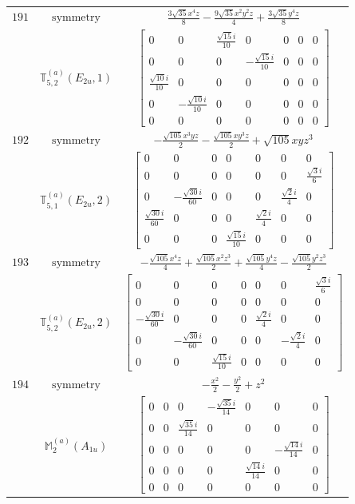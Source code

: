 \documentclass[fleqn,8pt,landscape]{jsarticle}
\begin{document}
\begin{longtable}{ccc}
$ 191 $ & $ \text{symmetry} $ & $ \frac{3 \sqrt{35} x^{4} z}{8} - \frac{9 \sqrt{35} x^{2} y^{2} z}{4} + \frac{3 \sqrt{35} y^{4} z}{8} $ \\
$  $ & $ \mathbb{T}_{5,2}^{(a)}(E_{2u},1) $ & $ \begin{bmatrix} 0 & 0 & \frac{\sqrt{15} i}{10} & 0 & 0 & 0 & 0 \\ 0 & 0 & 0 & - \frac{\sqrt{15} i}{10} & 0 & 0 & 0 \\ \frac{\sqrt{10} i}{10} & 0 & 0 & 0 & 0 & 0 & 0 \\ 0 & - \frac{\sqrt{10} i}{10} & 0 & 0 & 0 & 0 & 0 \\ 0 & 0 & 0 & 0 & 0 & 0 & 0 \end{bmatrix} $ \\ \hline
$ 192 $ & $ \text{symmetry} $ & $ - \frac{\sqrt{105} x^{3} y z}{2} - \frac{\sqrt{105} x y^{3} z}{2} + \sqrt{105} x y z^{3} $ \\
$  $ & $ \mathbb{T}_{5,1}^{(a)}(E_{2u},2) $ & $ \begin{bmatrix} 0 & 0 & 0 & 0 & 0 & 0 & 0 \\ 0 & 0 & 0 & 0 & 0 & 0 & \frac{\sqrt{3} i}{6} \\ 0 & - \frac{\sqrt{30} i}{60} & 0 & 0 & 0 & \frac{\sqrt{2} i}{4} & 0 \\ \frac{\sqrt{30} i}{60} & 0 & 0 & 0 & \frac{\sqrt{2} i}{4} & 0 & 0 \\ 0 & 0 & 0 & \frac{\sqrt{15} i}{10} & 0 & 0 & 0 \end{bmatrix} $ \\ \hline
$ 193 $ & $ \text{symmetry} $ & $ - \frac{\sqrt{105} x^{4} z}{4} + \frac{\sqrt{105} x^{2} z^{3}}{2} + \frac{\sqrt{105} y^{4} z}{4} - \frac{\sqrt{105} y^{2} z^{3}}{2} $ \\
$  $ & $ \mathbb{T}_{5,2}^{(a)}(E_{2u},2) $ & $ \begin{bmatrix} 0 & 0 & 0 & 0 & 0 & 0 & \frac{\sqrt{3} i}{6} \\ 0 & 0 & 0 & 0 & 0 & 0 & 0 \\ - \frac{\sqrt{30} i}{60} & 0 & 0 & 0 & \frac{\sqrt{2} i}{4} & 0 & 0 \\ 0 & - \frac{\sqrt{30} i}{60} & 0 & 0 & 0 & - \frac{\sqrt{2} i}{4} & 0 \\ 0 & 0 & \frac{\sqrt{15} i}{10} & 0 & 0 & 0 & 0 \end{bmatrix} $ \\ \hline
$ 194 $ & $ \text{symmetry} $ & $ - \frac{x^{2}}{2} - \frac{y^{2}}{2} + z^{2} $ \\
$  $ & $ \mathbb{M}_{2}^{(a)}(A_{1u}) $ & $ \begin{bmatrix} 0 & 0 & 0 & - \frac{\sqrt{35} i}{14} & 0 & 0 & 0 \\ 0 & 0 & \frac{\sqrt{35} i}{14} & 0 & 0 & 0 & 0 \\ 0 & 0 & 0 & 0 & 0 & - \frac{\sqrt{14} i}{14} & 0 \\ 0 & 0 & 0 & 0 & \frac{\sqrt{14} i}{14} & 0 & 0 \\ 0 & 0 & 0 & 0 & 0 & 0 & 0 \end{bmatrix} $ \\ \hline

\end{longtable}
\end{document}
